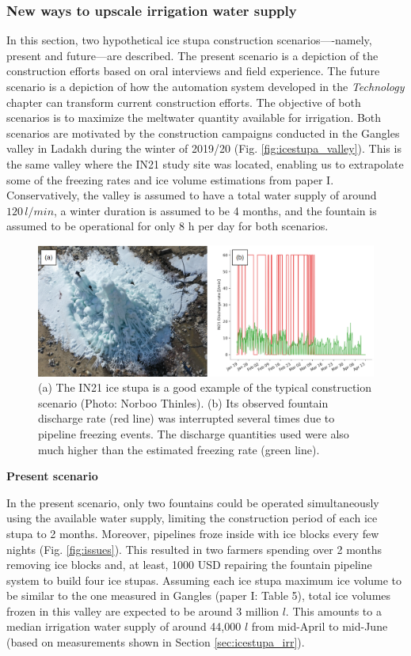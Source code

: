 \subsubsection{New ways to upscale irrigation water supply}

In this section, two hypothetical ice stupa construction scenarios----namely, present and future---are described. The
present scenario is a depiction of the construction efforts based on oral interviews and field experience. The
future scenario is a depiction of how the automation system developed in the \textit{Technology}
chapter can transform current construction
efforts. The objective of both scenarios is to maximize the meltwater quantity available for irrigation. Both
scenarios are motivated by the construction campaigns conducted in the Gangles valley in Ladakh during the
winter of 2019/20 (Fig. \ref{fig:icestupa_valley}). This is the same valley where the IN21 study site was
located, enabling us to extrapolate some of the freezing rates and ice volume estimations from
paper I. Conservatively, the valley is assumed to have a
total water supply of around $120\,l/min$, a winter duration is assumed to be 4 months, and the fountain is assumed to be  operational for
only 8 h per day for both scenarios. 

\begin{figure}[htb]
	\includegraphics[width=\textwidth]{figs/gangles_data}

  \caption{(a) The IN21 ice stupa is a good example of the typical construction scenario (Photo: Norboo
  Thinles). (b) Its observed fountain discharge rate (red line) was interrupted several times due to pipeline
freezing events. The discharge quantities used were also much higher than the estimated freezing rate (green
line). }

	\label{fig:gangles_data}
\end{figure}

\textbf{Present scenario}

In the present scenario, only two fountains could be operated simultaneously using the available water
supply, limiting the construction period of each ice stupa to 2 months. Moreover, pipelines froze
inside with ice blocks every few nights (Fig. \ref{fig:issues}). This resulted in two farmers spending over 2 months removing ice blocks and, at least, 1000 USD repairing the fountain pipeline system to build
four ice stupas. Assuming each ice stupa maximum ice volume to be similar to the one measured in Gangles (paper I:
Table 5), total ice volumes frozen in this valley are expected to be around 3 million $l$. This amounts to
a median irrigation water supply of around 44,000 $l$ from mid-April to mid-June (based on measurements
shown in Section \ref{sec:icestupa_irr}).

